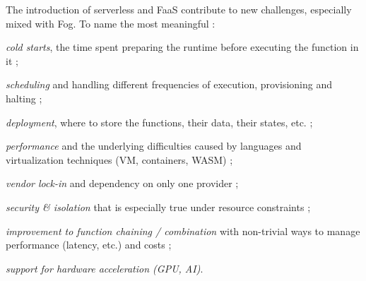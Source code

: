 \documentclass[11pt]{sdm}
\begin{document}
The introduction of serverless and \gls{FaaS} contribute to new challenges, especially mixed with Fog. To name the most meaningful \cite{kjorveziroski_iot_2021}:
\begin{enumerate*}
	\item \emph{cold starts}, the time spent preparing the runtime before executing the function in it ;
	\item \emph{scheduling} and handling different frequencies of execution, provisioning and halting ;
	\item \emph{deployment}, where to store the functions, their data, their states, etc. ;
	\item \emph{performance} and the underlying difficulties caused by languages and virtualization techniques (\gls{VM}, containers, WASM) ;
	\item \emph{vendor lock-in} and dependency on only one provider ;
	\item \emph{security \& isolation} that is especially true under resource constraints \cite{maurice_hello_2017} ;
	\item \emph{improvement to function chaining / combination} with non-trivial ways to manage performance (latency, etc.) and costs \cite{elgamal_costless_2018} ;
	\item \emph{support for hardware acceleration (\gls{GPU}, \gls{AI})}.
\end{enumerate*}

%

\end{document}

